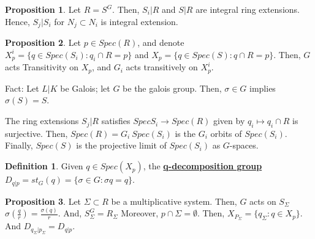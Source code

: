 \documentclass{article}
\theoremstyle{definition}
\theoremstyle{definition}
\theoremstyle{definition}
\newtheorem{proposition}{Proposition}[section]
\theoremstyle{definition}
\theoremstyle{definition}
\newtheorem{definition}{Definition}[section]
\theoremstyle{definition}
\theoremstyle{definition}
\begin{document}
\begin{tcolorbox}[colback=blue!5!white,colframe=blue!30!white]
\begin{proposition}
    Let $R=S^G$. Then, $S_i|R$ and $S|R$ are integral ring extensions. Hence, $S_j|S_i$ for $N_j\subset N_i$ is integral extension.
\end{proposition}
\end{tcolorbox}


\begin{tcolorbox}[colback=blue!5!white,colframe=blue!30!white]
\begin{proposition}
Let $p\in Spec(R)$, and denote $X^i_p=\{ q\in Spec(S_i):q_i\cap R=p \}$ and $X_p=\{ q\in Spec(S):q\cap R=p \}$. Then, $G$ acts Transitivity on $X_p$, and $G_i$ acts transitively on $X^i_p$.
 \end{proposition}
\end{tcolorbox}

Fact: Let $L|K$ be Galois; let $G$ be the galois group. Then, $\sigma\in G$ implies $\sigma(S)=S$. 



The ring extensions $S_j|R$ satisfies $Spec S_i\to Spec(R)$ given by $q_i\mapsto q_i\cap R$ is surjective. Then, $Spec(R)=G_i\ Spec(S_i)$ is the $G_i$ orbits of $Spec(S_i)$. Finally, $Spec(S)$ is the projective limit of $Spec(S_i)$ as $G$-spaces. 


\begin{tcolorbox}[colback=purple!5!white,colframe=purple!75!black]
\begin{definition}
Given $q\in Spec(X_p)$, the \underline{\textbf{q-decomposition group}} $D_{q|p}=st_G(q)=\{ \sigma\in G:\sigma q=q \}$. 
\end{definition}
\end{tcolorbox}


\begin{tcolorbox}[colback=blue!5!white,colframe=blue!30!white]
\begin{proposition}
Let $\Sigma\subset R$ be a multiplicative system. Then, $G$ acts on $S_{\Sigma}$ $\sigma(\frac{q}{r})=\frac{\sigma(q)}{r}$. And, $S^G_{\Sigma}=R_{\Sigma}$ Moreover, $p\cap \Sigma=\emptyset$. Then, $X_{P_{\Sigma}}=\{ q_{\Sigma}: q\in X_p \}$. And $D_{q_{\Sigma}|p_{\Sigma}}=D_{q|p}$. 

\end{proposition}
\end{tcolorbox}
\end{document}
